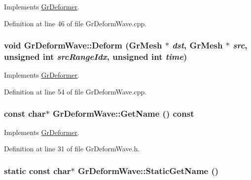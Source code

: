 Implements \hyperlink{class_gr_deformer_3a9f2e2afaea68d88f822b8e7daf3c8d}{GrDeformer}.

Definition at line 46 of file GrDeformWave.cpp.\hypertarget{class_gr_deform_wave_8beb11978116306cb10394563b241eb9}{
\subsubsection[{Deform}]{\setlength{\rightskip}{0pt plus 5cm}void GrDeformWave::Deform ({\bf GrMesh} $\ast$ {\em dst}, \/  {\bf GrMesh} $\ast$ {\em src}, \/  unsigned int {\em srcRangeIdx}, \/  unsigned int {\em time})}}
\label{class_gr_deform_wave_8beb11978116306cb10394563b241eb9}




Implements \hyperlink{class_gr_deformer_488a6a9156e48777a0042920cb8dd15e}{GrDeformer}.

Definition at line 54 of file GrDeformWave.cpp.\hypertarget{class_gr_deform_wave_ba87858cdf1442419942004c98691ee4}{
\subsubsection[{GetName}]{\setlength{\rightskip}{0pt plus 5cm}const char$\ast$ GrDeformWave::GetName () const}}
\label{class_gr_deform_wave_ba87858cdf1442419942004c98691ee4}




Implements \hyperlink{class_gr_deformer_c4b54b927f3b2febd0552bc610fe5b41}{GrDeformer}.

Definition at line 31 of file GrDeformWave.h.\hypertarget{class_gr_deform_wave_7e10cb2db580dc710dfe3f08ca1904bd}{
\subsubsection[{StaticGetName}]{\setlength{\rightskip}{0pt plus 5cm}static const char$\ast$ GrDeformWave::StaticGetName ()}}
\label{class_gr_deform_wave_7e10cb2db580dc710dfe3f08ca1904bd}




